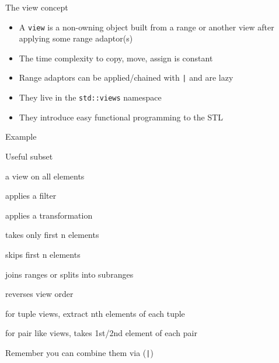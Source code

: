 \begin{frame}[fragile]
  \begin{block}{The view concept}
    \begin{itemize}
    \item A \texttt{view} is a non-owning object built from a range or another view after applying some range adaptor(s)
    \item The time complexity to copy, move, assign is constant
    \item Range adaptors can be applied/chained with \texttt{|} and are lazy
    \item They live in the \texttt{std::views} namespace
    \item They introduce easy functional programming to the STL
    \end{itemize}
  \end{block}
  \begin{exampleblock}{Example}
    { \small
    }
  \end{exampleblock}
\end{frame}

\begin{frame}[fragile]
  \begin{block}{Useful subset}
    \begin{description}
    \item[all] a view on all elements
    \item[filter] applies a filter
    \item[transform] applies a transformation
    \item[take] takes only first n elements
    \item[drop] skips first n elements
    \item[join/split] joins ranges or splits into subranges
    \item[reverse] reverses view order
    \item[elements] for tuple views, extract nth elements of each tuple
    \item[keys/values] for pair like views, takes 1st/2nd element of each pair
    \end{description}
  \end{block}
  Remember you can combine them via (\texttt{|})
\end{frame}

